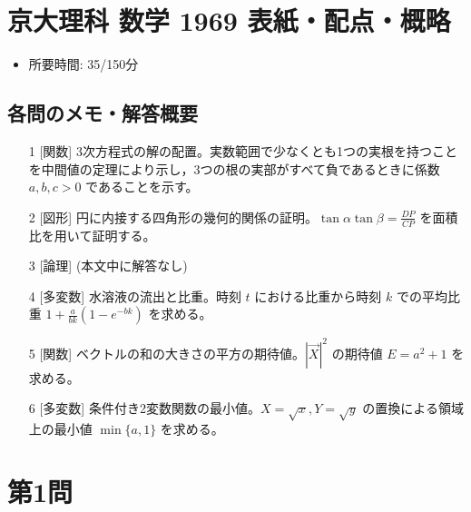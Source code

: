 \documentclass[../main.tex]{subfiles}
\begin{document}
\section*{京大理科 数学 1969 表紙・配点・概略}

\begin{itemize}
  \item 所要時間: 35/150分
\end{itemize}

\subsection*{各問のメモ・解答概要}
\begin{enumerate}
  \item[1] [関数] 3次方程式の解の配置。実数範囲で少なくとも1つの実根を持つことを中間値の定理により示し，3つの根の実部がすべて負であるときに係数 $a,b,c > 0$ であることを示す。
  \item[2] [図形] 円に内接する四角形の幾何的関係の証明。$\tan\alpha \tan\beta = \frac{DP}{CP}$ を面積比を用いて証明する。
  \item[3] [論理] (本文中に解答なし)
  \item[4] [多変数] 水溶液の流出と比重。時刻 $t$ における比重から時刻 $k$ での平均比重 $1 + \frac{a}{bk}(1-e^{-bk})$ を求める。
  \item[5] [関数] ベクトルの和の大きさの平方の期待値。$|\vec{X}|^2$ の期待値 $E = a^2+1$ を求める。
  \item[6] [多変数] 条件付き2変数関数の最小値。$X=\sqrt{x}, Y=\sqrt{y}$ の置換による領域上の最小値 $\min\{a, 1\}$ を求める。
\end{enumerate}

\newpage

\section*{第1問}
\end{document}
